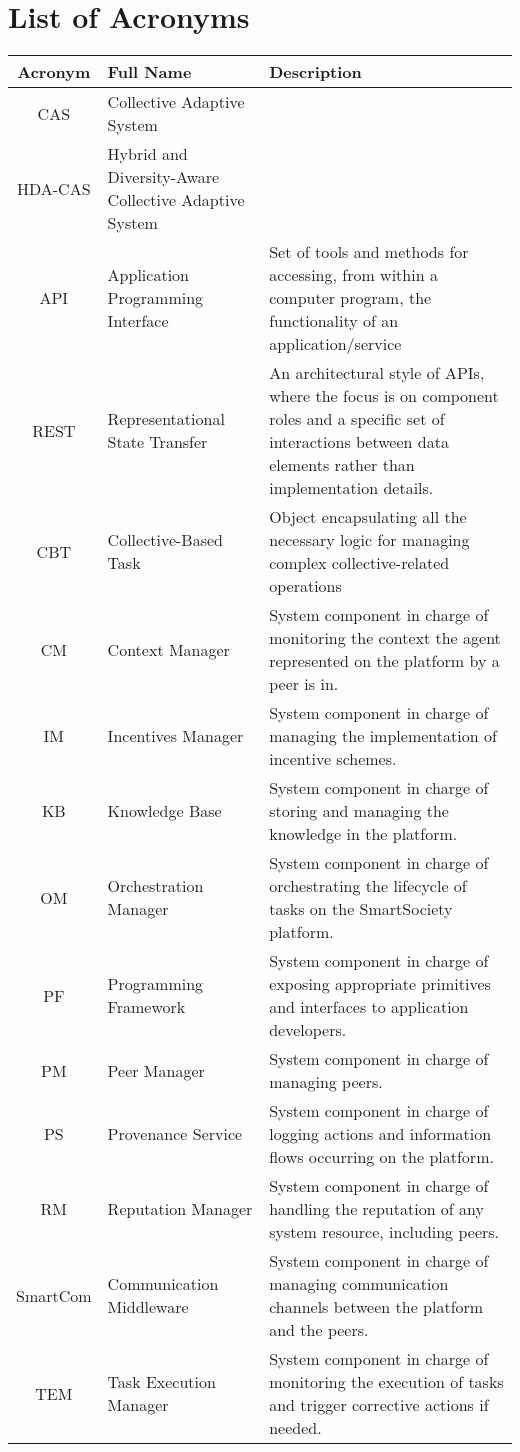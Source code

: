 \documentclass{SmartReport}
\begin{document}
\section*{List of Acronyms}
\begin{tabular}{|c|p{3cm}|p{10cm}|}
\hline 
\textbf{Acronym} & \textbf{Full Name} & \textbf{Description} \\
\hline 
\hline 
CAS & Collective Adaptive System & \\ \hline
HDA-CAS & Hybrid and Diversity-Aware Collective Adaptive System & \\ \hline
API & Application Programming Interface & Set of tools and methods for accessing, from within a computer program, the functionality of an application/service \\ \hline
REST & Representational State Transfer & An architectural style of APIs, where the focus is on component roles and a specific set of interactions between data elements rather than implementation details.\\ \hline
CBT & Collective-Based Task & Object encapsulating all the necessary logic for managing complex collective-related operations \\ \hline 
CM & Context Manager & System component in charge of monitoring the
context the agent represented on the platform by a peer is in.\\
\hline
IM & Incentives Manager & System component in charge of managing the implementation of incentive schemes.\\  
\hline 
KB & Knowledge Base &  System component in charge of storing and managing the knowledge in the platform.\\
\hline
OM & Orchestration Manager &  System component in charge of
orchestrating the lifecycle of tasks on the SmartSociety platform. \\
\hline 
PF & Programming Framework &  System component in charge of exposing
appropriate primitives and interfaces to application developers.\\
\hline 
PM & Peer Manager &  System component in charge of managing peers.\\
\hline 
PS & Provenance Service & System component in charge of logging actions and information flows occurring on the platform.\\
\hline
RM & Reputation Manager & System component in charge of handling the reputation of any system resource, including peers. \\
\hline
SmartCom & Communication Middleware & System component in charge of managing
communication channels between the platform and the peers. \\
\hline
TEM & Task Execution Manager & System component in charge of
monitoring the execution of tasks and trigger corrective actions if
needed.\\
\hline
\end{tabular}
\end{document}
